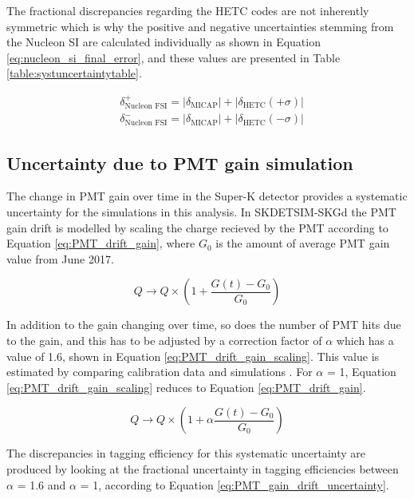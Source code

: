 The fractional discrepancies regarding the HETC codes are not inherently symmetric which is why the positive and negative uncertainties stemming from the Nucleon SI are calculated individually as shown in Equation \ref{eq:nucleon_si_final_error}, and these values are presented in Table \ref{table:systuncertaintytable}.

\begin{equation}
    \begin{aligned}
    & \delta_{\text{Nucleon FSI}}^{+}=\left|\delta_{\text{MICAP}}\right|+\left|\delta_{\text {HETC}}(+\sigma)\right| \\
    & \delta_{\text{Nucleon FSI}}^{-}=\left|\delta_{\text {MICAP}}\right|+\left|\delta_{\text {HETC}}(-\sigma)\right|
    \end{aligned}
    \label{eq:nucleon_si_final_error}
\end{equation}


\subsection{Uncertainty due to PMT gain simulation}

The change in PMT gain over time in the Super-K detector provides a systematic uncertainty for the simulations in this analysis. In SKDETSIM-SKGd the PMT gain drift is modelled by scaling the charge recieved by the PMT according to Equation \ref{eq:PMT_drift_gain}, where $G_{0}$ is the amount of average PMT gain value from June 2017. 

\begin{equation}
    Q \longrightarrow Q \times\left(1+\frac{G(t)-G_0}{G_0}\right)
\label{eq:PMT_drift_gain}
\end{equation}

In addition to the gain changing over time, so does the number of PMT hits due to the gain, and this has to be adjusted by a correction factor of $\alpha$ which has a value of 1.6, shown in Equation \ref{eq:PMT_drift_gain_scaling}. This value is estimated by comparing calibration data and simulations \cite{linyan_thesis}. For $\alpha$ = 1, Equation \ref{eq:PMT_drift_gain_scaling} reduces to Equation \ref{eq:PMT_drift_gain}.


\begin{equation}
    Q \longrightarrow Q \times\left(1+\alpha\frac{G(t)-G_0}{G_0}\right)
\label{eq:PMT_drift_gain_scaling}
\end{equation}

The discrepancies in tagging efficiency for this systematic uncertainty are produced by looking at the fractional uncertainty in tagging efficiencies between $\alpha$ = 1.6 and $\alpha$ = 1, according to Equation \ref{eq:PMT_gain_drift_uncertainty}.

